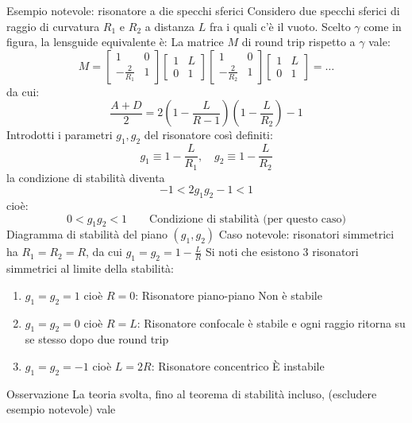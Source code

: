 Esempio notevole: risonatore a die specchi sferici
Considero due specchi sferici di raggio di curvatura $R_1$ e $R_2$ a distanza $L$ fra i quali c'è il vuoto. Scelto $\gamma$ come in figura, la lensguide equivalente è:
La matrice $M$ di round trip rispetto a $\gamma$ vale:
\begin{equation*}
M = \begin{bmatrix}
1	&	0\\
-\frac{2}{R_1}	&	1
\end{bmatrix}
\begin{bmatrix}
1	&	L\\
0	&	1
\end{bmatrix}
\begin{bmatrix}
1	&	0\\
-\frac{2}{R_2}	&	1
\end{bmatrix}
\begin{bmatrix}
1	&	L\\
0	&	1
\end{bmatrix} = \dots
\end{equation*}
da cui:
\begin{equation*}
\frac{A+D}{2} = 2(1-\frac{L}{R-1})(1-\frac{L}{R_2}) - 1
\end{equation*}
Introdotti i parametri $g_1, g_2$ del risonatore così definiti:
\begin{equation*}
g_1 \equiv 1-\frac{L}{R_1}, \quad g_2 \equiv 1-\frac{L}{R_2}
\end{equation*}
la condizione di stabilità diventa
\begin{equation*}
-1 < 2g_1 g_2 -1 <1
\end{equation*}
cioè:
\begin{equation*}
0 < g_1g_2 < 1 \qquad \text{Condizione di stabilità (per questo caso)}
\end{equation*}
Diagramma di stabilità del piano $(g_1,g_2)$
Caso notevole:
risonatori simmetrici ha $R_1=R_2=R$, da cui $g_1=g_2=1-\frac{L}{R}$
Si noti che esistono 3 risonatori simmetrici al limite della stabilità:
\begin{enumerate}
\item $g_1=g_2=1$ cioè $R=0$: Risonatore piano-piano
Non è stabile
\item $g_1=g_2=0$ cioè $R=L$: Risonatore confocale
è stabile e ogni raggio ritorna su se stesso dopo due round trip
\item $g_1=g_2 = -1$ cioè $L=2R$: Risonatore concentrico
È instabile
\end{enumerate}
Osservazione
La teoria svolta, fino al teorema di stabilità incluso, (escludere esempio notevole) vale




